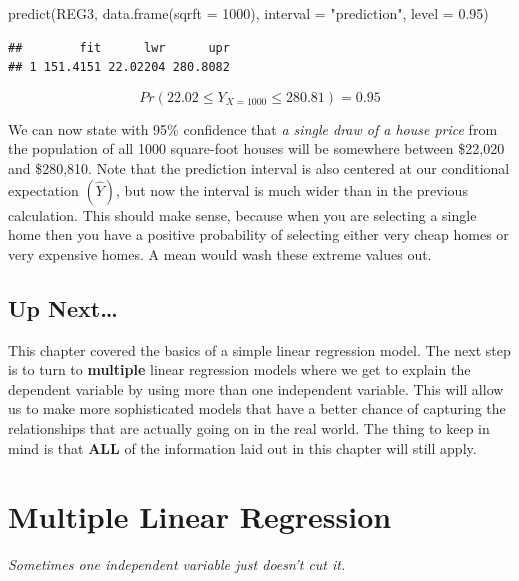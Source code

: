 \documentclass[
]{book}
\newenvironment{Shaded}{\begin{snugshade}}{\end{snugshade}}
\newcommand{\AttributeTok}[1]{\textcolor[rgb]{0.77,0.63,0.00}{#1}}
\newcommand{\DecValTok}[1]{\textcolor[rgb]{0.00,0.00,0.81}{#1}}
\newcommand{\FloatTok}[1]{\textcolor[rgb]{0.00,0.00,0.81}{#1}}
\newcommand{\FunctionTok}[1]{\textcolor[rgb]{0.00,0.00,0.00}{#1}}
\newcommand{\NormalTok}[1]{#1}
\newcommand{\StringTok}[1]{\textcolor[rgb]{0.31,0.60,0.02}{#1}}
\begin{document}
\begin{Shaded}
\begin{Highlighting}[]
\FunctionTok{predict}\NormalTok{(REG3,}
        \FunctionTok{data.frame}\NormalTok{(}\AttributeTok{sqrft =} \DecValTok{1000}\NormalTok{), }
        \AttributeTok{interval =} \StringTok{"prediction"}\NormalTok{,}
        \AttributeTok{level =} \FloatTok{0.95}\NormalTok{)}
\end{Highlighting}
\end{Shaded}

\begin{verbatim}
##        fit      lwr      upr
## 1 151.4151 22.02204 280.8082
\end{verbatim}

\[Pr(22.02\leq Y_{X=1000} \leq 280.81)=0.95\]

We can now state with 95\% confidence that \emph{a single draw of a house price} from the population of all 1000 square-foot houses will be somewhere between \$22,020 and \$280,810. Note that the prediction interval is also centered at our conditional expectation \((\hat{Y})\), but now the interval is much wider than in the previous calculation. This should make sense, because when you are selecting a single home then you have a positive probability of selecting either very cheap homes or very expensive homes. A mean would wash these extreme values out.

\hypertarget{up-next}{%
\section{Up Next\ldots{}}\label{up-next}}

This chapter covered the basics of a simple linear regression model. The next step is to turn to \textbf{multiple} linear regression models where we get to explain the dependent variable by using more than one independent variable. This will allow us to make more sophisticated models that have a better chance of capturing the relationships that are actually going on in the real world. The thing to keep in mind is that \textbf{ALL} of the information laid out in this chapter will still apply.

\hypertarget{MLR}{%
\chapter{Multiple Linear Regression}\label{MLR}}

\emph{Sometimes one independent variable just doesn't cut it.}
\end{document}
